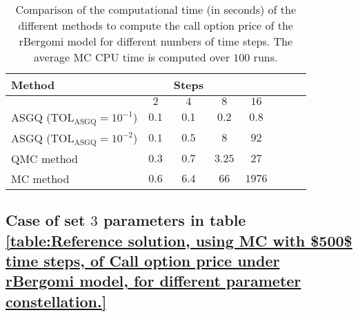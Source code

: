 \FloatBarrier
\begin{table}[h!]
	\centering
	\begin{tabular}{l*{6}{c}r}
		\toprule[1.5pt]
		Method & & Steps  & &     \\
		\hline	
		& $2$ & $4$ & $8$ & $16$ &   \\
		\hline
		ASGQ ($\text{TOL}_{\text{ASGQ}}=10^{-1}$)  & $0.1$ & $0.1$ & $0.2$ & $0.8$ \\
		ASGQ ($\text{TOL}_{\text{ASGQ}}=10^{-2}$)  & $0.1$ & $0.5$ & $8$ & $92$ \\
		\hline
		QMC method   & $ 0.3$  & $ 0.7$  & $ 3.25$ & $ 27$  \\	
		\hline
		MC method   & $ 0.6$  & $  6.4$  & $  66$ & $ 1976$  \\	
		
		\bottomrule[1.25pt]
	\end{tabular}
	\caption{Comparison of the computational time (in seconds) of  the different methods to compute the call option price of the rBergomi model for different numbers of time steps. The average  MC CPU time is computed over $100$ runs. }
	\label{Comparsion of the computational time of  MC and MISC, used to compute Call option price of rBergomi model for different number of time steps. Case set3}
\end{table}

\FloatBarrier

\subsection{Case of set $3$ parameters in table \ref{table:Reference solution, using MC with $500$ time steps, of Call option price under rBergomi model, for different parameter constellation.}}\label{appendix:Case of set 3 parameters}

